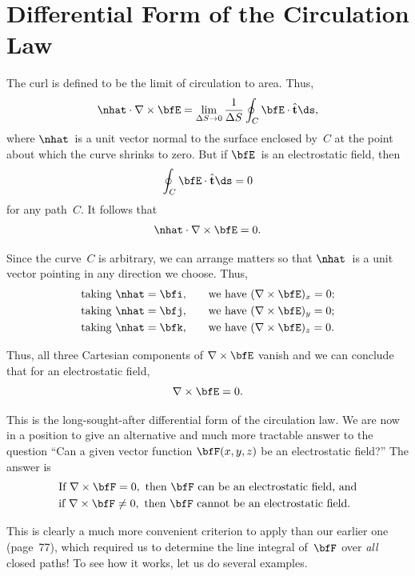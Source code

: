 \section{Differential Form of the Circulation Law}

The curl is defined to be the limit of circulation to area.  Thus,
\[
  \nhat\cdot\nabla\times\bfE
  = \lim_{\Delta S\to 0}\frac{1}{\Delta S}
    \oint_C \bfE\cdot\hat{\mathbf{t}}\ds,
\]
where $\nhat$~is a unit vector normal to the surface enclosed by~$C$ at
the point about which the curve shrinks to zero.  But if $\bfE$~is an
electrostatic field, then
\[
  \oint_C \bfE\cdot\hat{\mathbf{t}}\ds = 0
\]
for any path~$C$.  It follows that
\[
  \nhat\cdot\nabla\times\bfE = 0.
\]

Since the curve~$C$ is arbitrary, we can arrange matters so that
$\nhat$~is a unit vector pointing in any direction we choose.  Thus,
\begin{alignat*}{3}
  &\text{taking } \nhat=\bfi, &\quad &\text{we have }
    (\nabla\times\bfE)_x = 0; \\
  &\text{taking } \nhat=\bfj, &\quad &\text{we have }
    (\nabla\times\bfE)_y = 0; \\
  &\text{taking } \nhat=\bfk, &\quad &\text{we have }
    (\nabla\times\bfE)_z = 0.
\end{alignat*}

Thus, all three Cartesian components of $\nabla\times\bfE$ vanish and
we can conclude that for an electrostatic field,
\begin{equation}
  \nabla\times\bfE = 0.
\end{equation}

This is the long-sought-after differential form of the circulation law.
We are now in a position to give an alternative and much more tractable
answer to the question ``Can a given vector function $\bfF(x,y,z)$ be
an electrostatic field?''  The answer is
\begin{align*}
  &\text{If } \nabla\times\bfF = 0,
    \text{ then $\bfF$ can be an electrostatic field, and} \\
  &\text{if } \nabla\times\bfF \ne 0,
    \text{ then $\bfF$ cannot be an electrostatic field.}
\end{align*}

This is clearly a much more convenient criterion to apply than our
earlier one (page~77), which required us to determine the line integral
of~$\bfF$ over \emph{all} closed paths!  To see how it works, let us do
several examples.

